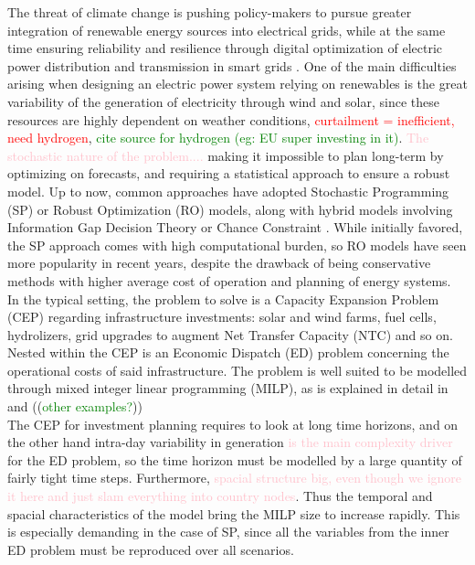 The threat of climate change is pushing policy-makers to pursue greater integration of renewable energy sources into electrical grids, while at the same time ensuring reliability and resilience through digital optimization of electric power distribution and transmission in smart grids \textcolor{green}{\cite{EU_context}}. One of the main difficulties arising when designing an electric power system relying on renewables is the great variability of the generation of electricity through wind and solar, since these resources are highly dependent on weather conditions, \textcolor{red}{curtailment = inefficient, need hydrogen}, \textcolor{Green}{cite source for hydrogen (eg: EU super investing in it)}. \textcolor{pink}{The stochastic nature of the problem....} making it impossible to plan long-term by optimizing on forecasts, and requiring a statistical approach to ensure a robust model.
Up to now, common approaches have adopted Stochastic Programming (SP) or Robust Optimization (RO) models, along with hybrid models involving Information Gap Decision Theory or Chance Constraint \textcolor{green}{\cite{review_math_opt}}. While initially favored, the SP approach comes with high computational burden, so RO models have seen more popularity in recent years, despite the drawback of being conservative methods with higher average cost of operation and planning of energy systems.\\
\indent In the typical setting, the problem to solve is a Capacity Expansion Problem (CEP) regarding infrastructure investments: solar and wind farms, fuel cells, hydrolizers, grid upgrades to augment Net Transfer Capacity (NTC) and so on. Nested within the CEP is an Economic Dispatch (ED) problem concerning the operational costs of said infrastructure. 
The problem is well suited to be modelled through mixed integer linear programming (MILP), as is explained in detail in \textcolor{green}{\cite{INTRO_isolated_MIP}} and ((\textcolor{Green}{other examples?}))\\
\indent The CEP for investment planning requires to look at long time horizons, and on the other hand intra-day variability in generation \textcolor{pink}{is the main complexity driver} for the ED problem, so the time horizon must be modelled by a large quantity of fairly tight time steps. Furthermore, \textcolor{pink}{spacial structure big, even though we ignore it here and just slam everything into country nodes}. 
Thus the temporal and spacial characteristics of the model bring the MILP size to increase rapidly. This is especially demanding in the case of SP, since all the variables from the inner ED problem must be reproduced over all scenarios.\\
